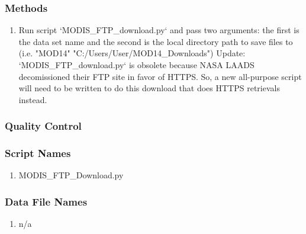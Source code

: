 \subsubsection*{Methods}
\begin{enumerate}
\item Run script `MODIS\_FTP\_download.py` and pass two arguments: the first is the data set name and the second is the local directory path to save files to (i.e. "MOD14" "C:/Users/User/MOD14\_Downloads")
Update: `MODIS\_FTP\_download.py` is obsolete because NASA LAADS decomissioned their FTP site in favor of HTTPS. So, a new all-purpose script will need to be written to do this download that does HTTPS retrievals instead.
\end{enumerate}
\subsubsection*{Quality Control}
\subsubsection*{Script Names}
\begin{enumerate}
\item MODIS\_FTP\_Download.py
\end{enumerate}
\subsubsection*{Data File Names}
\begin{enumerate}
\item n/a
\end{enumerate}